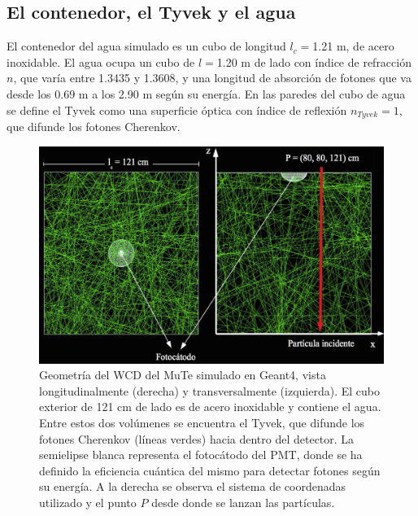 \documentclass[12pt,oneside,openany,letter]{book}
\begin{document}
\subsection{El contenedor, el Tyvek y el agua}
El contenedor del agua simulado es un cubo de longitud $l_c=$1.21 m, de acero inoxidable. El agua ocupa un cubo de $l=$1.20 m de lado con índice de refracción $n$, que var\'ia entre 1.3435 y 1.3608, y una longitud de absorción de fotones que va desde los 0.69 m a los 2.90 m según su energía. En las paredes del cubo de agua se define el Tyvek como una superficie óptica con índice de reflexión $n_{Tyvek}=1$, que difunde los fotones Cherenkov.

\begin{figure}[h!]
    \centering    \includegraphics[width=\textwidth]{wcd_punto.png}
   \caption[Geometría del WCD del MuTe simulado en Geant4]{Geometría del WCD del MuTe simulado en Geant4, vista longitudinalmente (derecha) y transversalmente (izquierda). El cubo exterior de 121 cm de lado es de acero inoxidable y contiene el agua. Entre estos dos volúmenes se encuentra el Tyvek, que difunde los fotones Cherenkov (líneas verdes) hacia dentro del detector. La semielipse blanca representa el fotocátodo del PMT, donde se ha definido la eficiencia cu\'antica del mismo para detectar fotones seg\'un su energ\'ia. A la derecha se observa el sistema de coordenadas utilizado y el punto $P$ desde donde se lanzan las partículas.}\label{wcd}
\end{figure}

\end{document}
